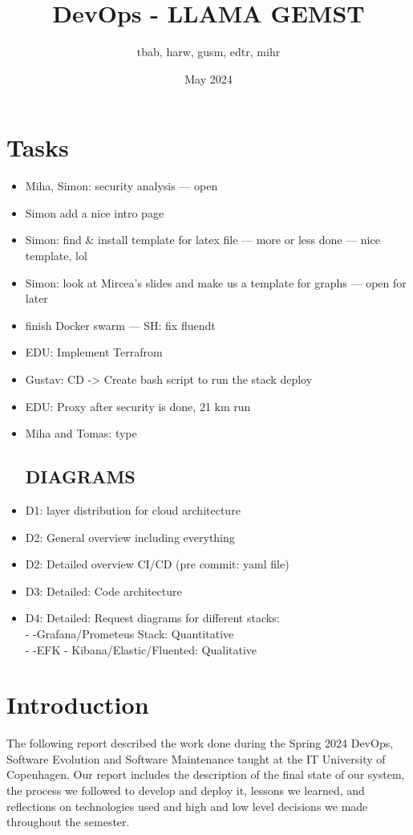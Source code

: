 \documentclass{article}
\title{DevOps - LLAMA GEMST}
\author{tbab, harw, gusm, edtr, mihr}
\date{May 2024}
\begin{document}
\maketitle

\section{Tasks}

\begin{itemize}
  \item Miha, Simon: security analysis — open
  \item Simon add a nice intro page
  \item Simon: find \& install template for latex file — more or less done — nice template, lol
  \item Simon: look at Mircea's slides and make us a template for graphs — open for later
  \item finish Docker swarm — SH: fix fluendt 
    \item EDU: Implement Terrafrom
    \item Gustav: CD -> Create bash script to run the stack deploy
    \item EDU: Proxy after security is done, 21 km run
   \item Miha and Tomas: type

\subsection{DIAGRAMS}
 
    \item D1: layer distribution for cloud architecture 
    \item D2: General overview including everything 
    \item D2: Detailed overview CI/CD (pre commit: yaml file)
    \item D3: Detailed: Code architecture 
    \item D4: Detailed: Request diagrams for different stacks:
        \\ - -Grafana/Prometeus Stack: Quantitative 
        \\ - -EFK - Kibana/Elastic/Fluented: Qualitative

 \end{itemize}
\section{Introduction}
The following report described the work done during the Spring 2024 DevOps, Software Evolution and Software Maintenance taught at the IT University of Copenhagen. Our report includes the description of the final state of our system, the process we followed to develop and deploy it, lessons we learned, and reflections on technologies used and high and low level decisions we made throughout the semester.
\end{document}
